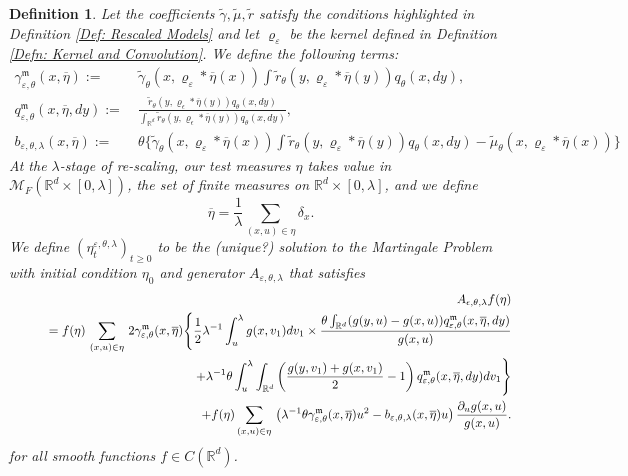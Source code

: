 \documentclass[12pt]{article}
\newtheorem{definition}[theorem]{Definition}
\def \non{{\nonumber}}
\def \tilde{\widetilde}
\def \bar{\overline}
\begin{document}
\begin{definition}\label{Def: Rescaled Lookdown Models}
Let the coefficients $\tilde{\gamma}, \tilde{\mu}, \tilde{r}$ satisfy the conditions highlighted in Definition \ref{Def: Rescaled Models} and let $\varrho_{\varepsilon}$ be the kernel defined in Definition \ref{Defn: Kernel and Convolution}. We define the following terms:
\begin{align*}
\gamma^{\mathfrak{m}}_{\varepsilon,\theta}(x, \overline{\eta}):=&~\tilde{\gamma}_{\theta}(x, \varrho_{\varepsilon}*\overline{\eta}(x)) \int \tilde{r}_{\theta}(y, \varrho_{\varepsilon}*\overline{\eta}(y))q_{\theta}(x,dy),\\
 q^{\mathfrak{m}}_{\varepsilon, \theta}(x,\overline{\eta},dy) :=&~ \frac{\tilde{r}_{\theta}(y,\varrho_{\epsilon}*\overline{\eta}(y)) q_{\theta}(x,dy)}{\int_{\mathbb{R}^d} \tilde{r}_{\theta}(y,\varrho_{\epsilon}*\overline{\eta}(y)) q_{\theta}(x,dy)},\\
b_{\varepsilon, \theta, \lambda}(x, \overline{\eta}):=&~ \theta \bigg\{ \tilde{\gamma}_{\theta}(x, \varrho_{\varepsilon}*\overline{\eta}(x)) \int \tilde{r}_{\theta}(y, \varrho_{\varepsilon}*\overline{\eta}(y))q_{\theta}(x,dy)-\tilde{\mu}_{\theta}(x, \varrho_{\varepsilon}*\overline{\eta}(x)) \bigg\}
\end{align*}
At the $\lambda$-stage of re-scaling, our test measures $\eta$ takes value in $\mathcal{M}_F(\mathbb{R}^d \times [0,\lambda])$, the set of finite measures on $\mathbb{R}^d \times [0,\lambda]$, and we define $$\overline{\eta}= \frac{1}{\lambda}\sum_{(x,u) \in \eta}\delta_x.$$
We define $(\eta^{\varepsilon, \theta, \lambda}_t)_{t \geq 0}$ to be the (unique?) solution to the Martingale Problem with initial condition $\eta_0$ and generator $A_{\varepsilon, \theta, \lambda}$ that satisfies
\begin{eqnarray}\label{Eq: Prelimit Lookdown Generator}
&&A_{\epsilon, \theta, \lambda}f(\eta ) \\
&&\quad =f(\eta )\,\sum_{(x,u)\in\eta}\,2 \gamma^{\mathfrak{m}}_{\varepsilon,\theta}(x, \overline{\eta})\Bigg\{ \frac 12 \lambda^{-1}\int_u^{
\lambda}g(x,v_1)dv_1\times \frac { \theta\int_{\mathbb{R}^d}(g(y,u)-g(x,u))q^{\mathfrak{m}}_{\varepsilon,\theta}(x,\bar{
\eta },dy)}{g(x,u)}\non\\
&&\qquad\qquad\qquad\qquad\qquad\qquad\qquad +\lambda^{-1}\theta\int_u^{
\lambda}\int_{\mathbb{R}^d}\left(\frac{g(y,v_1)+g(x,v_1)}{2}-1\right)q^{\mathfrak{m}}_{\varepsilon,\theta}(x,\overline{\eta },dy)dv_1\nonumber\Bigg\}\\
&&\qquad\qquad
+f(\eta )\sum_{(x,u)\in\eta}\,\left(\lambda^{-1} \theta \gamma^{\mathfrak{m}}_{\varepsilon,\theta}(x,\overline{\eta}) u^2 -b_{\varepsilon,\theta, \lambda}(x,\overline{\eta})u\right)\frac {\partial_u g(x,u)}{g(x,u)}.\nonumber
\end{eqnarray}
for all smooth functions $f \in C(\mathbb{R}^d)$. 
\end{definition}
\end{document}
